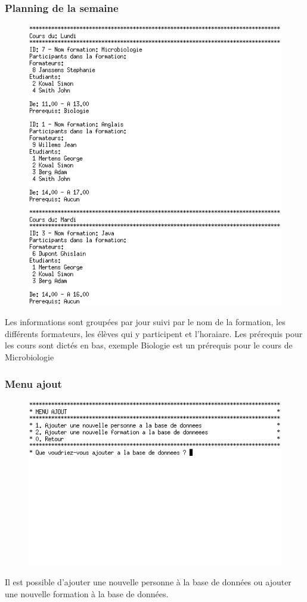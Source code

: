 \documentclass[11pt]{article}
\begin{document}
\newpage
\subsubsection{Planning de la semaine}
\begin{figure}[ht]
  \centering
  \includegraphics[scale=0.8]{images/05.png.png}
\end{figure}
Les informations sont groupées par jour suivi par le nom de la formation, les différents formateurs, les élèves qui y participent et l'horaiare. Les prérequis pour les cours sont dictés en bas, exemple Biologie est un prérequis pour le cours de Microbiologie

\newpage
\subsubsection{Menu ajout}
\begin{figure}[ht]
  \centering
  \includegraphics[trim=0 210 0 0, clip, scale=0.8]{images/06.png.png}
\end{figure}
Il est possible d'ajouter une nouvelle personne à la base de données ou ajouter une nouvelle formation à la base de données.
\end{document}
